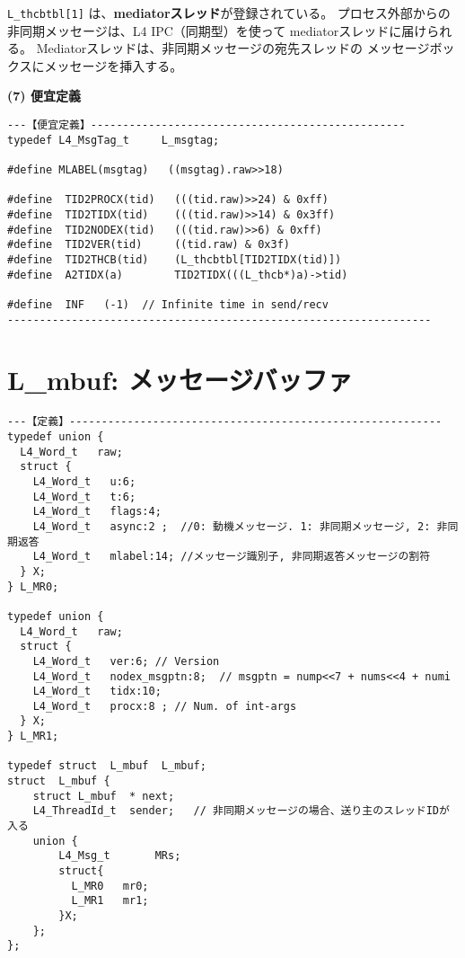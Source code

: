 \verb|L_thcbtbl[1]| は、{\bf mediatorスレッド}が登録されている。
プロセス外部からの非同期メッセージは、L4 IPC（同期型）を使って
mediatorスレッドに届けられる。
Mediatorスレッドは、非同期メッセージの宛先スレッドの
メッセージボックスにメッセージを挿入する。



{\flushleft\bf (7) 便宜定義}

\begin{verbatim}
---【便宜定義】-------------------------------------------------
typedef L4_MsgTag_t     L_msgtag;

#define MLABEL(msgtag)   ((msgtag).raw>>18)

#define  TID2PROCX(tid)   (((tid.raw)>>24) & 0xff)
#define  TID2TIDX(tid)    (((tid.raw)>>14) & 0x3ff)
#define  TID2NODEX(tid)   (((tid.raw)>>6) & 0xff)
#define  TID2VER(tid)     ((tid.raw) & 0x3f)
#define  TID2THCB(tid)    (L_thcbtbl[TID2TIDX(tid)])
#define  A2TIDX(a)        TID2TIDX(((L_thcb*)a)->tid)

#define  INF   (-1)  // Infinite time in send/recv
------------------------------------------------------------------
\end{verbatim}


\section{ L\_mbuf: メッセージバッファ}

\begin{verbatim}
---【定義】----------------------------------------------------------
typedef union {
  L4_Word_t   raw;
  struct {
    L4_Word_t   u:6;
    L4_Word_t   t:6;
    L4_Word_t   flags:4;
    L4_Word_t   async:2 ;  //0: 動機メッセージ. 1: 非同期メッセージ, 2: 非同期返答
    L4_Word_t   mlabel:14; //メッセージ識別子, 非同期返答メッセージの割符
  } X;
} L_MR0;

typedef union {
  L4_Word_t   raw;
  struct {
    L4_Word_t   ver:6; // Version
    L4_Word_t   nodex_msgptn:8;  // msgptn = nump<<7 + nums<<4 + numi
    L4_Word_t   tidx:10;
    L4_Word_t   procx:8 ; // Num. of int-args
  } X;
} L_MR1;

typedef struct  L_mbuf  L_mbuf;
struct  L_mbuf {
    struct L_mbuf  * next;
    L4_ThreadId_t  sender;   // 非同期メッセージの場合、送り主のスレッドIDが入る
    union {
        L4_Msg_t       MRs;
        struct{
          L_MR0   mr0;
          L_MR1   mr1;
        }X;
    };
};

\end{verbatim}



